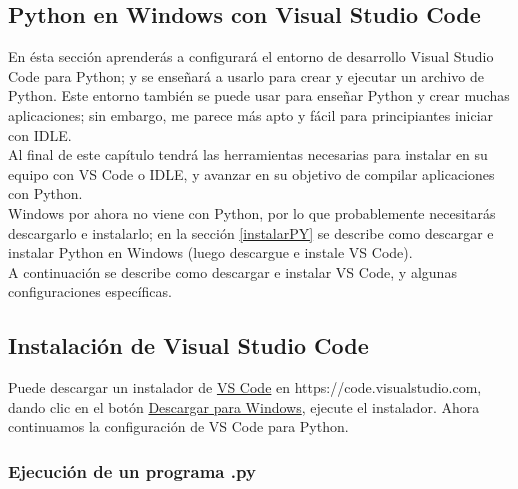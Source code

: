 \subsection{Python en Windows con Visual Studio Code}

En ésta sección aprenderás a  configurará el entorno de desarrollo Visual Studio Code para Python; y se enseñará a usarlo para crear y ejecutar un archivo de Python. Este entorno también se puede usar  para enseñar  Python y crear muchas aplicaciones; sin embargo, me parece más apto y fácil para principiantes iniciar con IDLE. \\

Al final de este capítulo tendrá las herramientas necesarias para instalar en su equipo con VS Code o IDLE, y avanzar en su objetivo de compilar aplicaciones con Python.\\











Windows por ahora no viene con Python, por lo que probablemente necesitarás descargarlo e
instalarlo; en la sección \ref{instalarPY} se describe como descargar e instalar Python en Windows (luego descargue  e instale VS Code).\\

A  continuación se describe como descargar e instalar VS Code, y algunas configuraciones específicas.

\subsection*{Instalación de Visual Studio Code}

Puede descargar un instalador de \href{https://code.visualstudio.com}{\color{vino} VS Code} en {\ttfamily \scriptsize  https://code.visualstudio.com},  dando clic en el botón   \href{https://code.visualstudio.com/docs/?dv=win64user}{\color{vino} Descargar para Windows}, ejecute el instalador. Ahora continuamos la configuración de VS Code para Python.


\subsubsection{Ejecución de un programa .py}

